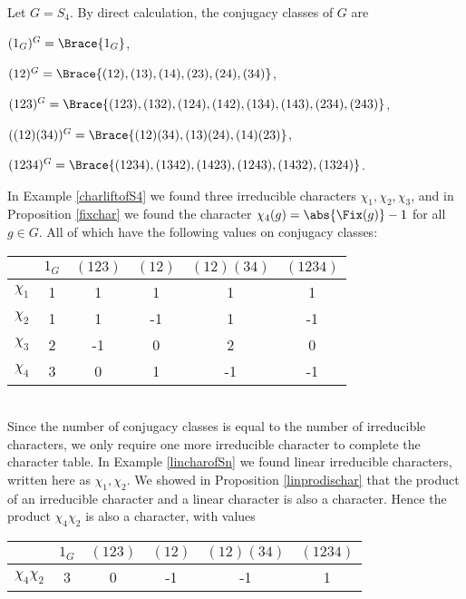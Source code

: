 \documentclass[../Project.tex]{subfiles}
\begin{document}
\begin{exam}
Let $G = S_4$. By direct calculation, the conjugacy classes of $G$ are 
		\begin{mitem}
			\item $(1_{G})^G = \Brace{1_{G}}$,
			\item $(12)^G = \Brace{(12),(13),(14),(23),(24),(34)}$,
			\item $(123)^G = \Brace{(123),(132),(124),(142),(134),(143),(234),(243)}$,
			\item $((12)(34))^G = \Brace{(12)(34),(13)(24),(14)(23)}$,
			\item $(1234)^G = \Brace{(1234),(1342),(1423),(1243),(1432),(1324)}$.
		\end{mitem}
	

In Example \ref{charliftofS4} we found three irreducible characters $\chi_1,\chi_2,\chi_3$, and in Proposition \ref{fixchar} we found the character $\chi_4(g) = \abs{\Fix(g)} - 1$ for all $g \in G$. All of which have the following values on conjugacy classes:

	\begin{minipage}{\linewidth}
\centering
	\begin{tabular}{c | c  c  c  c  c}
		  $ $ & $1_{G}$ & $(123)$ & $(12)$ & $(12)(34)$ & $(1234)$\\
	\hline
		$\chi_1$ & 1 & 1 & 1 & 1 & 1\\
		$\chi_2$ & 1 & 1 & -1 & 1 & -1\\
		$\chi_3$ & 2 & -1 & 0 & 2 & 0\\
		$\chi_4$ & 3 & 0 & 1 & -1 & -1\\
	\hline
	\end{tabular}
	\end{minipage}\\

Since the number of conjugacy classes is equal to the number of irreducible characters, we only require one more irreducible character to complete the character table. In Example \ref{lincharofSn} we found linear irreducible characters, written here as $\chi_1,\chi_2$. We showed in Proposition \ref{linprodischar} that the product of an irreducible character and a linear character is also a character. Hence the product $\chi_4\chi_2$ is also a character, with values\\

	\begin{minipage}{\linewidth}
\centering
	\begin{tabular}{c | c  c  c  c  c}
		  $ $ & $1_{G}$ & $(123)$ & $(12)$ & $(12)(34)$ & $(1234)$\\
	\hline
		$\chi_4\chi_2$ & 3 & 0 & -1 & -1 & 1\\
	\hline
	\end{tabular}
	\end{minipage}\\


\end{exam}
\end{document}
